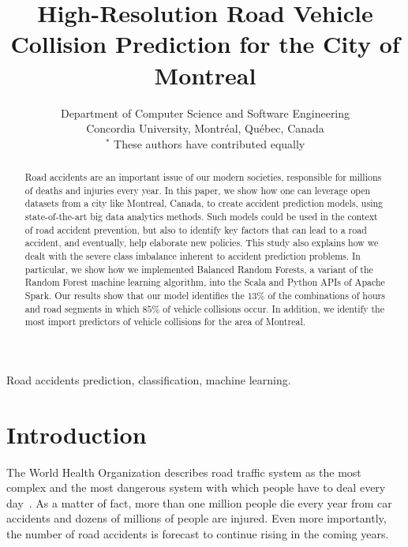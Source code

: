 \documentclass[conference]{IEEEtran}
\begin{document}
\title{High-Resolution Road Vehicle Collision Prediction for the City of Montreal}
\author{
Department of Computer Science and Software Engineering \\
Concordia University, Montréal, Québec, Canada\\
$^*$ These authors have contributed equally

}

\maketitle

\begin{abstract}
Road accidents are an important issue of our modern societies, responsible
for millions of deaths and injuries every year. In this paper, we show how one can
leverage open datasets from a city like Montreal, Canada, to create
accident prediction models, using state-of-the-art big data analytics
methods. Such models could be used in the context of road accident
prevention, but also to identify key factors that can lead to a road
accident, and eventually, help elaborate new policies. This study also
explains how we dealt with the severe class imbalance inherent to accident
prediction problems. In particular, we show
how we implemented Balanced Random Forests, a variant of the Random Forest
machine learning algorithm, into the Scala and Python APIs of Apache Spark.
Our results show that our model identifies the $13\%$ of the combinations of 
hours and road segments in which $85\%$ of vehicle collisions occur. In addition,
we identify the most import predictors of vehicle collisions for the area of 
Montreal.

\end{abstract}

\begin{IEEEkeywords}
Road accidents prediction, classification, machine learning.
\end{IEEEkeywords}

\section{Introduction}

The World Health Organization describes road traffic system as the most
complex and the most dangerous system with which people have to deal every
day~\cite{Peden2004}. As a matter of fact, more than one million people
die every year from car accidents and dozens of millions of people are
injured. Even more importantly, the number of road accidents is forecast to
continue rising in the coming years.
\end{document}
